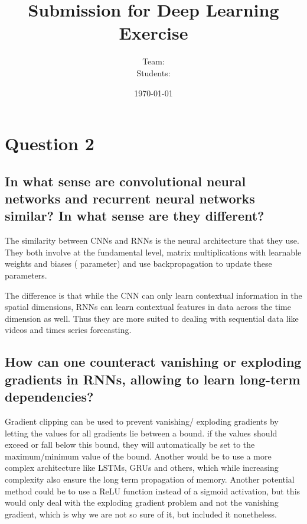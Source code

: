 \documentclass[addpoints]{exam}
\title{Submission for Deep Learning Exercise \assignmentnumber}
\author{Team: \teamname\\Students: \students}
\date{\today}
\begin{document}
    \maketitle


    \section{Question 2}
		\subsection{In what sense are convolutional neural networks and recurrent neural networks similar? In what sense are they different?}
		The similarity between CNNs and RNNs is the neural architecture that they use. They both involve at the fundamental level, matrix multiplications with learnable weights and biases ( parameter) and use backpropagation to update these parameters.
		
		The difference is that while the CNN can only learn contextual information in the spatial dimensions, RNNs can learn contextual features in data across the time dimension as well. Thus they are more suited to dealing with sequential data like videos and times series forecasting.
		
		\subsection{How can one counteract vanishing or exploding gradients in RNNs, allowing to learn long-term dependencies?}
		Gradient clipping can be used to prevent vanishing/ exploding gradients by letting the values for all gradients lie between a bound. if the values should exceed or fall below this bound, they will automatically be set to the maximum/minimum value of the bound.
		Another would be to use a more complex architecture like LSTMs, GRUs and others, which while increasing complexity also ensure the long term propagation of memory.
		Another potential method could be to use a ReLU function instead of a sigmoid activation, but this would only deal with the exploding gradient problem and not the vanishing gradient, which is why we are not so sure of it, but included it nonetheless.
\end{document}
